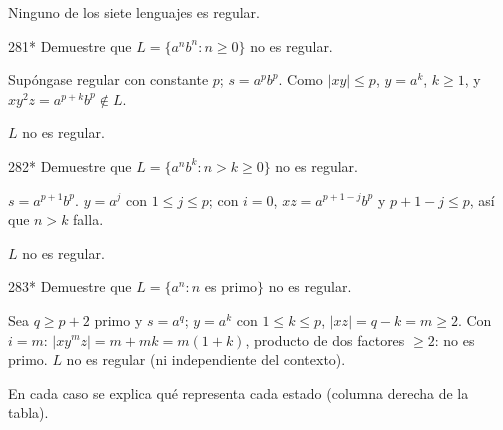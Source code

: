 \documentclass[11pt]{article}
\begin{document}
\resp Ninguno de los siete lenguajes es regular.


\begin{ejercicio}{281}{*}
Demuestre que $L = \{a^nb^n : n \ge 0\}$ no es regular.
\end{ejercicio}
\proc Supóngase regular con constante $p$; $s = a^pb^p$. Como $|xy| \le p$, $y = a^k$, $k \ge 1$, y $xy^2z = a^{p+k}b^p \notin L$.

\resp $L$ no es regular.


\begin{ejercicio}{282}{*}
Demuestre que $L = \{a^nb^k : n > k \ge 0\}$ no es regular.
\end{ejercicio}
\proc $s = a^{p+1}b^p$. $y = a^j$ con $1 \le j \le p$; con $i = 0$, $xz = a^{p+1-j}b^p$ y $p + 1 - j \le p$, así que $n > k$ falla.

\resp $L$ no es regular.


\begin{ejercicio}{283}{*}
Demuestre que $L = \{a^n : n$ es primo$\}$ no es regular.
\end{ejercicio}
\proc Sea $q \ge p + 2$ primo y $s = a^q$; $y = a^k$ con $1 \le k \le p$, $|xz| = q - k = m \ge 2$. Con $i = m$: $|xy^mz| = m + mk = m(1 + k)$, producto de dos factores $\ge 2$: no es primo.
\resp $L$ no es regular (ni independiente del contexto).


En cada caso se explica qué representa cada estado (columna derecha de la tabla).
\end{document}
